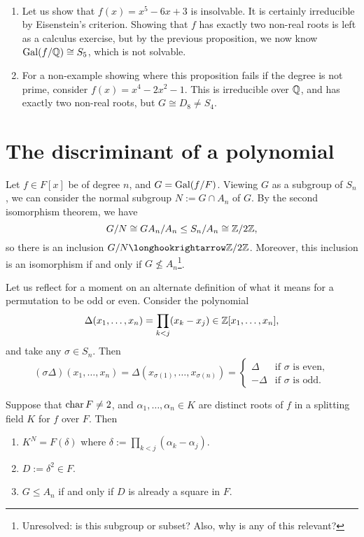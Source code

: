 \begin{example}~
    \begin{enumerate}
        \item Let us show that $f(x) = x^5 - 6x + 3$ is insolvable. It is certainly irreducible by Eisenstein's criterion. Showing that $f$ has exactly two non-real roots is left as a calculus exercise, but by the previous proposition, we now know $\operatorname{Gal}(f/\mathbb{{Q}}) \cong S_5$, which is not solvable.
        
        \item For a non-example showing where this proposition fails if the degree is not prime, consider $f(x) = x^4 - 2x^2 - 1$. This is irreducible over $\mathbb{{Q}}$, and has exactly two non-real roots, but $G \cong D_8 \neq S_4$.
    \end{enumerate}
\end{example}

\section{The discriminant of a polynomial}

Let $f \in F[x]$ be of degree $n$, and $G = \operatorname{Gal}(f/F)$. Viewing $G$ as a subgroup of $S_n$, we can consider the normal subgroup $N := G \cap A_n$ of $G$. By the second isomorphism theorem, we have
\[
    G/N \cong GA_n/A_n \leq S_n/A_n \cong \mathbb{{Z}}/{{2}}\mathbb{{Z}},
\]
so there is an inclusion $G/N \inclusion \zn{2}$. Moreover, this inclusion is an isomorphism if and only if $G \not\leq A_n$\footnote{Unresolved: is this subgroup or subset? Also, why is any of this relevant?}.

Let us reflect for a moment on an alternate definition of what it means for a permutation to be odd or even. Consider the polynomial
\[
    \Delta(x_1, \ldots, x_n) = \prod_{k < j} (x_k - x_j) \in \mathbb{{Z}}[x_1, \ldots, x_n],
\]
and take any $\sigma \in S_n$. Then
\[
    (\sigma \Delta)(x_1, \ldots, x_n) = \Delta(x_{\sigma(1)}, \ldots, x_{\sigma(n)}) = \begin{cases}
        \Delta & \text{if } \sigma \text{ is even}, \\
        -\Delta & \text{if } \sigma \text{ is odd}.
    \end{cases}
\]

\begin{proposition}
    Suppose that $\operatorname{char}{{F}} \neq 2$, and $\alpha_1, \ldots, \alpha_n \in K$ are distinct roots of $f$ in a splitting field $K$ for $f$ over $F$. Then
    \begin{enumerate}[label=(\alph*)]
        \item $K^N = F(\delta)$ where $\delta := \prod_{k < j} (\alpha_k - \alpha_j)$.
        \item $D := \delta^2 \in F$.
        \item $G \leq A_n$ if and only if $D$ is already a square in $F$.
    \end{enumerate}
\end{proposition}

